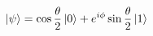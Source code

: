 \documentclass[preview]{standalone}
\begin{document}
\begin{align*}
\ket{\psi} = \cos{\frac{\theta}{2}} \ket{0} + e^{i\phi}\sin{\frac{\theta}{2}} \ket{1}
\end{align*}
\end{document}
